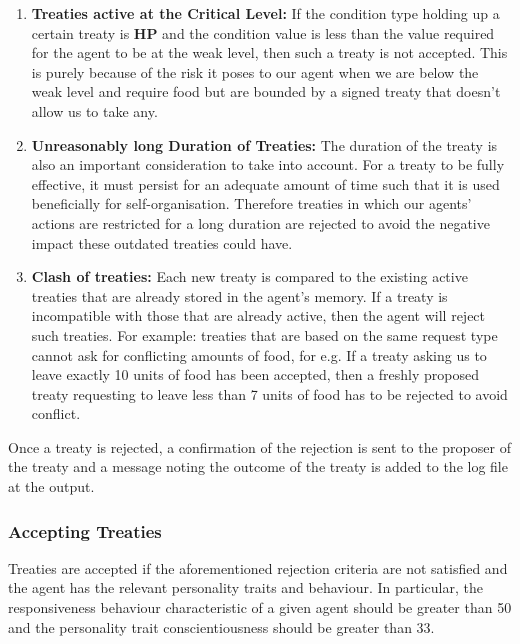 \begin{enumerate}
    \item 
    \textbf{Treaties active at the Critical Level:} \newline
    If the condition type holding up a certain treaty is \textbf{HP} and the condition value is less than the value required for the agent to be at the weak level, then such a treaty is not accepted. This is purely because of the risk it poses to our agent when we are below the weak level and require food but are bounded by a signed treaty that doesn't allow us to take any.
    
    \item 
    \textbf{Unreasonably long Duration of Treaties:} \newline
    The duration of the treaty is also an important consideration to take into account. For a treaty to be fully effective, it must persist for an adequate amount of time such that it is used beneficially for self-organisation. Therefore treaties in which our agents' actions are restricted for a long duration are rejected to avoid the negative impact these outdated treaties could have. 
    
    \item 
    \textbf{Clash of treaties:} \newline
    Each new treaty is compared to the existing active treaties that are already stored in the agent's memory. If a treaty is incompatible with those that are already active, then the agent will reject such treaties. For example: treaties that are based on the same request type cannot ask for conflicting amounts of food, for e.g. If a treaty asking us to leave exactly 10 units of food has been accepted, then a freshly proposed treaty requesting to leave less than 7 units of food has to be rejected to avoid conflict.
\end{enumerate}

Once a treaty is rejected, a confirmation of the rejection is sent to the proposer of the treaty and a message noting the outcome of the treaty is added to the log file at the output.

\subsubsection{Accepting Treaties}
\label{subsec: Accepting Treaties}

Treaties are accepted if the aforementioned rejection criteria are not satisfied and the agent has the relevant personality traits and behaviour. In particular, the responsiveness behaviour characteristic of a given agent should be greater than 50 and the personality trait conscientiousness should be greater than 33. 
\newline

